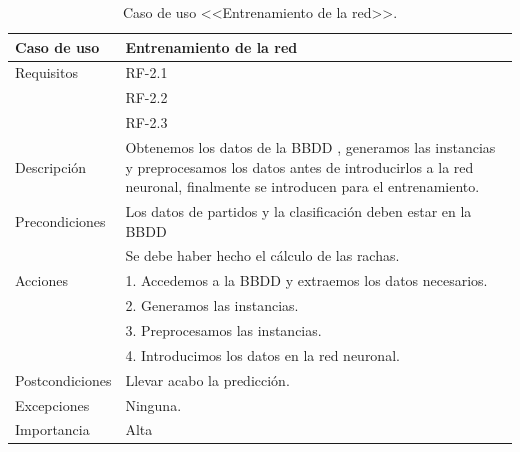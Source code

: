 \begin{table}
  \begin{center}
   \begin{tabular}{|p{3cm} | p{9cm} |}
    \hline
    Caso de uso & Entrenamiento de la red\\
    \hline
    Requisitos & RF-2.1\\
    	& RF-2.2\\
	    & RF-2.3\\
    \hline
    Descripción & Obtenemos los datos de la BBDD , generamos las instancias y preprocesamos los datos antes de introducirlos a la red neuronal, finalmente se introducen para el entrenamiento.\\
    \hline
    Precondiciones &Los datos de partidos y la clasificación deben estar en la BBDD\\
    &Se debe haber hecho el cálculo de las rachas.\\
    \hline
  	Acciones & 1. Accedemos a la BBDD y extraemos los datos necesarios. \\
    &2. Generamos las instancias.\\
    &3. Preprocesamos las instancias.\\
	&4. Introducimos los datos en la red neuronal.\\
    \hline
    Postcondiciones & Llevar acabo la predicción. \\
    \hline
    Excepciones & Ninguna.\\
    \hline
    Importancia & Alta\\
    \hline
   \end{tabular}
   \caption{Caso de uso <<Entrenamiento de la red>>.}
   \label{tabla:casoUso2.1}
  \end{center}
 \end{table} 
 

